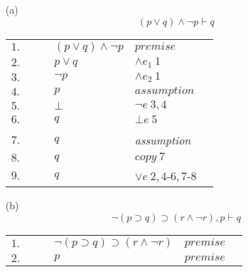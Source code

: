 \documentclass[12pt]{article}
\begin{document}
\begin{itemize}
	\item[(a)] \[(p \lor q) \land \neg p \vdash q\]
		\begin{table}[H]
		\centering
		\begin{tabular}{*6{l}}
			$1.$ & & & $(p \lor q) \land \neg p$ & $premise$ & \\
			
			$2.$ & & & $p \lor q$ & $\land e_1 \ 1$ & \\
			
			$3.$ & & & $\neg p$ & $\land e_2 \ 1$ & \\
			\cline{2-6}
			
			$4.$ &\multicolumn{1}{|c}{} & & $p$ & $assumption$ &\multicolumn{1}{c|}{}\\
			
			$5.$ &\multicolumn{1}{|c}{} & & $\bot$ & $\neg e \ 3, 4$ &\multicolumn{1}{c|}{}\\
			
			$6.$ &\multicolumn{1}{|c}{} & & $q$ & $\bot e \ 5$ &\multicolumn{1}{c|}{}\\ \cline{2-6}
			
			\vspace{-12 pt}
			& & & & & \\ \cline{2-6}
			
			$7.$ &\multicolumn{1}{|c}{} & & $q$ &\textit{assumption} &\multicolumn{1}{c|}{}\\
			
			$8.$ &\multicolumn{1}{|c}{} & & $q$ & $copy \ 7$ &\multicolumn{1}{c|}{}\\ \cline{2-6}
			
			$9.$ & & & $q$ & $\lor e \ 2, 4$-$6, 7$-$8$ & \\
		
		\end{tabular}
		\end{table}
		
		
	\item[(b)]
		\[
			\neg (p \supset q) \supset (r \land \neg r), p \vdash q
		\]
		\begin{table}[H]
		\centering
		\begin{tabular}{*6{l}}
			$1.$ & & & $\neg (p \supset q) \supset (r \land \neg r)$ & $premise$ & \\
			
			$2.$ & & & $p$ & $premise$ & \\
		
			\cline{2-6}
			

\end{tabular}
\end{table}
\end{itemize}
\end{document}
